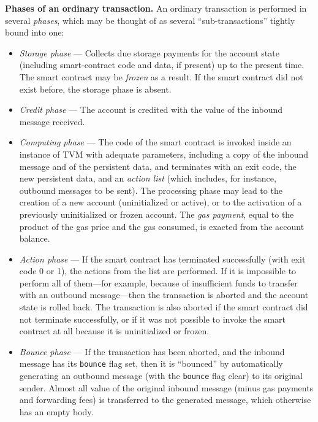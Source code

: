 \documentclass[12pt,oneside]{article}
\def\makepoint#1{\medbreak\noindent{\bf #1.\ }}
\def\nxsubpoint{\refstepcounter{subsubsection}%
  \smallbreak\makepoint{\thesubsubsection}}
\def\emb#1{\textbf{#1.}}
\begin{document}
\nxsubpoint\emb{Phases of an ordinary transaction}
An ordinary transaction is performed in several {\em phases}, which may be thought of as several ``sub-transactions'' tightly bound into one:
\begin{itemize}
\item {\em Storage phase} --- Collects due storage payments for the account state (including smart-contract code and data, if present) up to the present time. The smart contract may be {\em frozen\/} as a result. If the smart contract did not exist before, the storage phase is absent.
\item {\em Credit phase} --- The account is credited with the value of the inbound message received.
\item {\em Computing phase} --- The code of the smart contract is invoked inside an instance of TVM with adequate parameters, including a copy of the inbound message and of the persistent data, and terminates with an exit code, the new persistent data, and an {\em action list} (which includes, for instance, outbound messages to be sent). The processing phase may lead to the creation of a new account (uninitialized or active), or to the activation of a previously uninitialized or frozen account. The {\em gas payment}, equal to the product of the gas price and the gas consumed, is exacted from the account balance.
\item {\em Action phase} --- If the smart contract has terminated successfully (with exit code 0 or 1), the actions from the list are performed. If it is impossible to perform all of them---for example, because of insufficient funds to transfer with an outbound message---then the transaction is aborted and the account state is rolled back. The transaction is also aborted if the smart contract did not terminate successfully, or if it was not possible to invoke the smart contract at all because it is uninitialized or frozen.
\item {\em Bounce phase} --- If the transaction has been aborted, and the inbound message has its {\tt bounce} flag set, then it is ``bounced'' by automatically generating an outbound message (with the {\tt bounce} flag clear) to its original sender. Almost all value of the original inbound message (minus gas payments and forwarding fees) is transferred to the generated message, which otherwise has an empty body.
\end{itemize}
\end{document}
